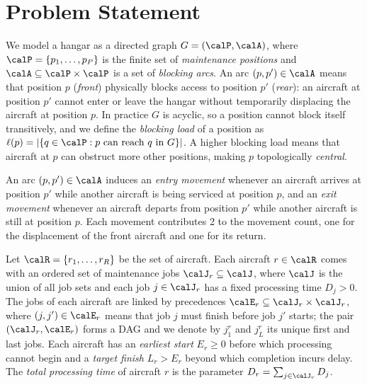 \section{Problem Statement}
\label{sec:problem}

We model a hangar as a directed graph $G = (\calP, \calA)$, where
$\calP = \{p_1, \dots, p_P\}$ is the finite set of \emph{maintenance positions}
and $\calA \subseteq \calP \times \calP$ is a set of \emph{blocking arcs}.  An
arc $(p, p') \in \calA$ means that position $p$ (\emph{front}) physically
blocks access to position $p'$ (\emph{rear}): an aircraft at position $p'$
cannot enter or leave the hangar without temporarily displacing the aircraft
at position $p$.  In practice $G$ is acyclic, so a position cannot block
itself transitively, and we define the \emph{blocking load} of a position as
$\ell(p) = |\{q \in \calP : p \text{ can reach } q \text{ in } G\}|$.  A
higher blocking load means that aircraft at $p$ can obstruct more other
positions, making $p$ topologically \emph{central}.

\begin{definition}
  An arc $(p, p') \in \calA$ induces an \emph{entry movement} whenever an
  aircraft arrives at position $p'$ while another aircraft is being serviced
  at position $p$, and an \emph{exit movement} whenever an aircraft departs
  from position $p'$ while another aircraft is still at position $p$.  Each
  movement contributes 2 to the movement count, one for the displacement of
  the front aircraft and one for its return.
\end{definition}

Let $\calR = \{r_1, \dots, r_R\}$ be the set of aircraft.  Each aircraft
$r \in \calR$ comes with an ordered set of maintenance jobs
$\calJ_r \subseteq \calJ$, where $\calJ$ is the union of all job sets and
each job $j \in \calJ_r$ has a fixed processing time $D_j > 0$.  The jobs of
each aircraft are linked by precedences $\calE_r \subseteq \calJ_r \times
\calJ_r$, where $(j, j') \in \calE_r$ means that job $j$ must finish before
job $j'$ starts; the pair $(\calJ_r, \calE_r)$ forms a DAG and we denote by
$j^r_1$ and $j^r_L$ its unique first and last jobs.  Each aircraft has an
\emph{earliest start} $E_r \ge 0$ before which processing cannot begin and a
\emph{target finish} $L_r > E_r$ beyond which completion incurs delay.  The
\emph{total processing time} of aircraft $r$ is the parameter
$D_r = \sum_{j \in \calJ_r} D_j$.

